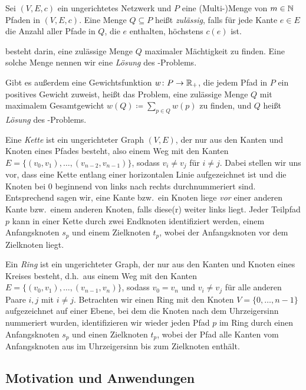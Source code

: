 \begin{definition}
    Sei $(V,E,c)$ ein ungerichtetes Netzwerk und $P$ eine (Multi-)Menge von $m \in \mathbb N$ Pfaden in $(V,E,c)$.
    Eine Menge $Q \subseteq P$ heißt {\em zulässig}, falls für jede Kante $e \in E$ die Anzahl aller Pfade in $Q$,
    die $e$ enthalten, höchstens $c(e)$ ist.
    
    {\em \CallControl} besteht darin, eine zulässige Menge $Q$ maximaler Mächtigkeit zu finden.
    Eine solche Menge nennen wir eine {\em Lösung} des \CallControl-Problems.
    
    Gibt es außerdem eine Gewichtsfunktion $w \colon P \rightarrow \mathbb R_+$, die jedem Pfad in $P$ ein 
    positives Gewicht zuweist, heißt das Problem, eine zulässige Menge $Q$ mit maximalem Gesamtgewicht
    $w(Q) \coloneqq \sum_{p \in Q} w(p)$ zu finden, {\em \WeightedCallControl} und $Q$ heißt 
    {\em Lösung} des \WeightedCallControl-Problems.
\end{definition}

Eine {\em Kette} ist ein ungerichteter Graph $(V,E)$, der nur aus den Kanten und Knoten eines Pfades besteht, also einem
Weg mit den Kanten $E=\{(v_0, v_1),\dots,(v_{n-2},v_{n-1})\}$, sodass $v_i \neq v_j$ für $i \neq j$.
Dabei stellen wir uns vor, dass eine Kette entlang einer horizontalen Linie aufgezeichnet ist und die
Knoten bei $0$ beginnend von links nach rechts durchnummeriert sind. 
Entsprechend sagen wir, eine Kante bzw.\ ein Knoten liege {\em vor} einer anderen Kante bzw.\ einem anderen Knoten, 
falls diese(r) weiter links liegt.
Jeder Teilpfad $p$ kann in einer Kette durch zwei Endknoten identifiziert werden, einem Anfangsknoten $s_p$ und einem 
Zielknoten $t_p$, wobei der Anfangsknoten vor dem Zielknoten liegt.

Ein {\em Ring} ist ein ungerichteter Graph, der nur aus den Kanten und Knoten eines Kreises besteht, d.h.\ aus einem Weg 
mit den Kanten $E=\{(v_0, v_1),\dots,(v_{n-1},v_{n})\}$, sodass $v_0 = v_n$ und $v_i \neq v_j$ für alle anderen Paare $i,j$ 
mit $i \neq j$.
Betrachten wir einen Ring mit den Knoten $V=\{0, \dots , n-1\}$ aufgezeichnet auf einer Ebene, bei dem die Knoten nach
dem Uhrzeigersinn nummeriert wurden, identifizieren wir wieder jeden Pfad $p$ im Ring durch einen Anfangsknoten $s_p$ und einen Zielknoten 
$t_p$, wobei der Pfad alle Kanten vom Anfangsknoten aus im Uhrzeigersinn bis zum Zielknoten enthält.

\subsection{Motivation und Anwendungen}\label{subsec:motivationUndAnwendungen}

